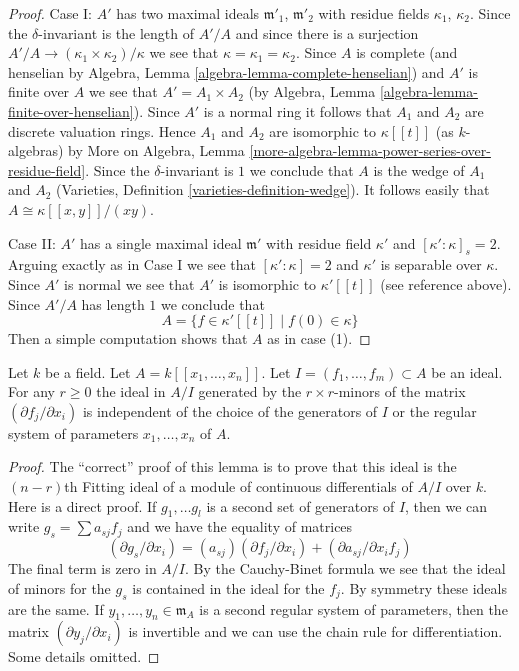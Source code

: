\begin{proof}
\medskip\noindent
Case I: $A'$ has two maximal ideals $\mathfrak m'_1$, $\mathfrak m'_2$
with residue fields $\kappa_1$, $\kappa_2$.
Since the $\delta$-invariant is the length of $A'/A$ and
since there is a surjection $A'/A \to (\kappa_1 \times \kappa_2)/\kappa$
we see that $\kappa = \kappa_1 = \kappa_2$. Since $A$ is complete
(and henselian by Algebra, Lemma \ref{algebra-lemma-complete-henselian})
and $A'$ is finite over $A$ we see that $A' = A_1 \times A_2$
(by Algebra, Lemma \ref{algebra-lemma-finite-over-henselian}).
Since $A'$ is a normal ring it follows that $A_1$ and $A_2$ are
discrete valuation rings.
Hence $A_1$ and $A_2$ are isomorphic to $\kappa[[t]]$
(as $k$-algebras) by
More on Algebra, Lemma \ref{more-algebra-lemma-power-series-over-residue-field}.
Since the $\delta$-invariant is $1$ we conclude that $A$
is the wedge of $A_1$ and $A_2$
(Varieties, Definition \ref{varieties-definition-wedge}).
It follows easily that $A \cong \kappa[[x, y]]/(xy)$.

\medskip\noindent
Case II: $A'$ has a single maximal ideal $\mathfrak m'$ with residue
field $\kappa'$ and $[\kappa' : \kappa]_s = 2$. Arguing exactly
as in Case I we see that $[\kappa' : \kappa] = 2$ and $\kappa'$
is separable over $\kappa$. Since $A'$ is normal we see that
$A'$ is isomorphic to $\kappa'[[t]]$ (see reference above).
Since $A'/A$ has length $1$ we conclude that
$$
A = \{f \in \kappa'[[t]] \mid f(0) \in \kappa\}
$$
Then a simple computation shows that $A$ as in case (1).
\end{proof}

\begin{lemma}
\label{lemma-fitting-ideal-well-defined}
Let $k$ be a field. Let $A = k[[x_1, \ldots, x_n]]$. Let
$I = (f_1, \ldots, f_m) \subset A$ be an ideal. For any
$r \geq 0$ the ideal in $A/I$ generated by the $r \times r$-minors
of the matrix $(\partial f_j/\partial x_i)$ is independent
of the choice of the generators of $I$ or the
regular system of parameters $x_1, \ldots, x_n$ of $A$.
\end{lemma}

\begin{proof}
The ``correct'' proof of this lemma is to prove that this ideal
is the $(n - r)$th Fitting ideal of a module of continuous differentials
of $A/I$ over $k$. Here is a direct proof.
If $g_1, \ldots g_l$ is a second set of generators of $I$, then
we can write $g_s = \sum a_{sj}f_j$ and we have the equality of matrices
$$
(\partial g_s/\partial x_i) = (a_{sj}) (\partial f_j/\partial x_i)
+ (\partial a_{sj}/\partial x_i f_j)
$$
The final term is zero in $A/I$.
By the Cauchy-Binet formula we see that the ideal of minors for the
$g_s$ is contained in the ideal for the $f_j$. By symmetry
these ideals are the same. If $y_1, \ldots, y_n \in \mathfrak m_A$
is a second regular system of parameters, then the matrix
$(\partial y_j/\partial x_i)$
is invertible and we can use the chain rule for differentiation.
Some details omitted.
\end{proof}

